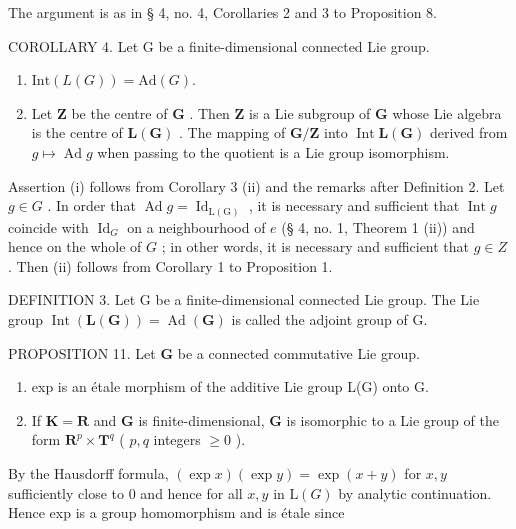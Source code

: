 The argument is as in § 4, no. 4, Corollaries 2 and 3 to Proposition 8.

COROLLARY 4. Let G be a finite-dimensional connected Lie group.

\begin{enumerate}
\def\labelenumi{(\roman{enumi})}
\item
  \(\text{Int}(L(G)) = \text{Ad}(G).\)
\item
  Let \(\mathbf{Z}\) be the centre of \(\mathbf{G}\) . Then \(\mathbf{Z}\) is a Lie subgroup of \(\mathbf{G}\) whose Lie algebra is the centre of \(\mathbf{L}(\mathbf{G})\) . The mapping of \(\mathbf{G} / \mathbf{Z}\) into \(\operatorname{Int} \mathbf{L}(\mathbf{G})\) derived from \(g \mapsto \operatorname{Ad} g\) when passing to the quotient is a Lie group isomorphism.
\end{enumerate}

Assertion (i) follows from Corollary 3 (ii) and the remarks after Definition 2. Let \(g \in G\) . In order that \(\operatorname{Ad} g = \operatorname{Id}_{\operatorname{L(G)}}\) , it is necessary and sufficient that \(\operatorname{Int} g\) coincide with \(\operatorname{Id}_G\) on a neighbourhood of \(e\) (§ 4, no. 1, Theorem 1 (ii)) and hence on the whole of \(G\) ; in other words, it is necessary and sufficient that \(g \in Z\) . Then (ii) follows from Corollary 1 to Proposition 1.

DEFINITION 3. Let G be a finite-dimensional connected Lie group. The Lie group \(\operatorname{Int}(\mathbf{L}(\mathbf{G})) = \operatorname{Ad}(\mathbf{G})\) is called the adjoint group of G.

PROPOSITION 11. Let \(\mathbf{G}\) be a connected commutative Lie group.

\begin{enumerate}
\def\labelenumi{(\roman{enumi})}
\item
  exp is an étale morphism of the additive Lie group L(G) onto G.
\item
  If \(\mathbf{K} = \mathbf{R}\) and \(\mathbf{G}\) is finite-dimensional, \(\mathbf{G}\) is isomorphic to a Lie group of the form \(\mathbf{R}^p \times \mathbf{T}^q\) ( \(p, q\) integers \(\geqslant 0\) ).
\end{enumerate}

By the Hausdorff formula, \((\exp x)(\exp y) = \exp (x + y)\) for \(x,y\) sufficiently close to 0 and hence for all \(x,y\) in \(\mathrm{L}(G)\) by analytic continuation. Hence exp is a group homomorphism and is étale since

